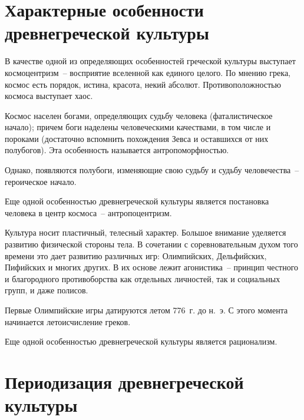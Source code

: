 \section{Характерные особенности древнегреческой культуры}

  В качестве одной из определяющих особенностей греческой культуры выступает
  космоцентризм~-- восприятие вселенной как единого целого. По мнению грека,
  космос есть порядок, истина, красота, некий абсолют. Противоположностью
  космоса выступает хаос.
  
  Космос населен богами, определяющих судьбу человека (фаталистическое начало);
  причем боги наделены человеческими качествами, в том числе и пороками
  (достаточно вспомнить похождения Зевса и оставшихся от них полубогов). Эта
  особенность называется антропоморфностью.
  
  Однако, появляются полубоги, изменяющие свою судьбу и судьбу человечества~--
  героическое начало.
  
  Еще одной особенностью древнегреческой культуры является постановка человека в
  центр космоса~-- антропоцентризм.
  
  \charskip{*}
  
  Культура носит пластичный, телесный характер. Большое внимание уделяется
  развитию физической стороны тела. В сочетании с соревновательным духом того
  времени это дает развитию различных игр: Олимпийских, Дельфийских, Пифийских и
  многих других. В их основе лежит агонистика~-- принцип честного и благородного
  противоборства как отдельных личностей, так и социальных групп, и даже
  полисов.
  
  Первые Олимпийские игры датируются летом 776~г. до н.~э. С этого момента
  начинается летоисчисление греков.
  
  Еще одной особенностью древнегреческой культуры является рационализм.

\section{Периодизация древнегреческой культуры}

